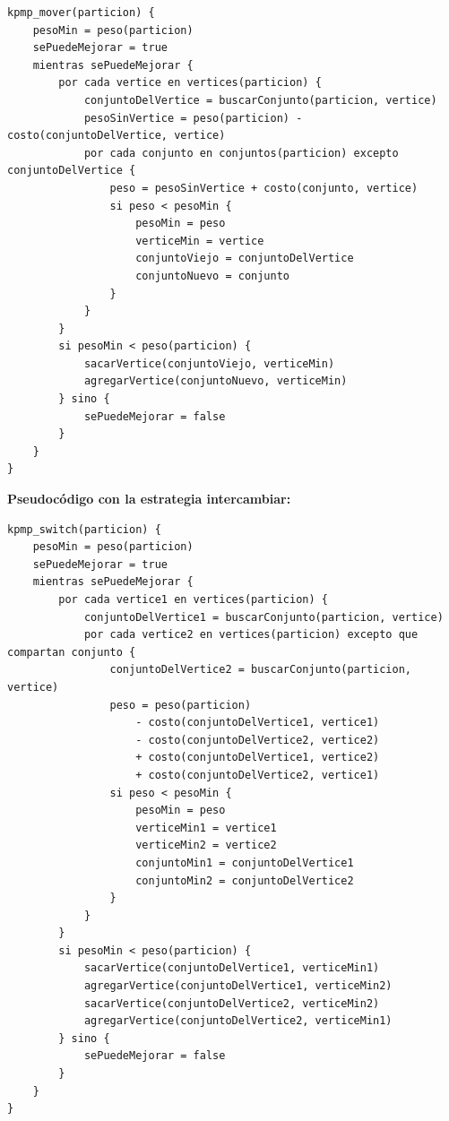 \begin{verbatim}
kpmp_mover(particion) {
    pesoMin = peso(particion)
    sePuedeMejorar = true
    mientras sePuedeMejorar {
        por cada vertice en vertices(particion) {
            conjuntoDelVertice = buscarConjunto(particion, vertice)
            pesoSinVertice = peso(particion) - costo(conjuntoDelVertice, vertice)
            por cada conjunto en conjuntos(particion) excepto conjuntoDelVertice {
                peso = pesoSinVertice + costo(conjunto, vertice)
                si peso < pesoMin {
                    pesoMin = peso
                    verticeMin = vertice
                    conjuntoViejo = conjuntoDelVertice
                    conjuntoNuevo = conjunto
                }
            }
        }
        si pesoMin < peso(particion) {
            sacarVertice(conjuntoViejo, verticeMin)
            agregarVertice(conjuntoNuevo, verticeMin)
        } sino {
            sePuedeMejorar = false
        }
    }
}
\end{verbatim}

\newpage

\textbf{Pseudocódigo con la estrategia intercambiar:}

\vspace*{0.3cm}

\begin{verbatim}
kpmp_switch(particion) {
    pesoMin = peso(particion)
    sePuedeMejorar = true
    mientras sePuedeMejorar {
        por cada vertice1 en vertices(particion) {
            conjuntoDelVertice1 = buscarConjunto(particion, vertice)
            por cada vertice2 en vertices(particion) excepto que compartan conjunto {
                conjuntoDelVertice2 = buscarConjunto(particion, vertice)
                peso = peso(particion)
                    - costo(conjuntoDelVertice1, vertice1)
                    - costo(conjuntoDelVertice2, vertice2)
                    + costo(conjuntoDelVertice1, vertice2)
                    + costo(conjuntoDelVertice2, vertice1)
                si peso < pesoMin {
                    pesoMin = peso
                    verticeMin1 = vertice1
                    verticeMin2 = vertice2
                    conjuntoMin1 = conjuntoDelVertice1
                    conjuntoMin2 = conjuntoDelVertice2
                }
            }
        }
        si pesoMin < peso(particion) {
            sacarVertice(conjuntoDelVertice1, verticeMin1)
            agregarVertice(conjuntoDelVertice1, verticeMin2)
            sacarVertice(conjuntoDelVertice2, verticeMin2)
            agregarVertice(conjuntoDelVertice2, verticeMin1)
        } sino {
            sePuedeMejorar = false
        }
    }
}
\end{verbatim}



